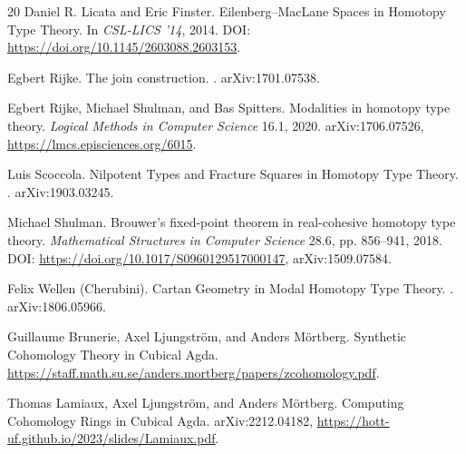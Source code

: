 \documentclass[a4paper,UKenglish,cleveref, autoref, thm-restate]{lipics-v2021}
\begin{document}
\begin{thebibliography}{20}
Daniel R. Licata and Eric Finster.
\newblock Eilenberg--MacLane Spaces in Homotopy Type Theory.
\newblock In \emph{CSL-LICS '14}, 2014.
\newblock DOI: \url{https://doi.org/10.1145/2603088.2603153}.

Egbert Rijke.
\newblock The join construction.
. arXiv:1701.07538.

Egbert Rijke, Michael Shulman, and Bas Spitters.
\newblock Modalities in homotopy type theory.
\newblock \emph{Logical Methods in Computer Science} 16.1, 2020.
\newblock arXiv:1706.07526, \url{https://lmcs.episciences.org/6015}.

Luis Scoccola.
\newblock Nilpotent Types and Fracture Squares in Homotopy Type Theory.
. arXiv:1903.03245.

Michael Shulman.
\newblock Brouwer’s fixed-point theorem in real-cohesive homotopy type theory.
\newblock \emph{Mathematical Structures in Computer Science} 28.6, pp. 856--941, 2018.
\newblock DOI: \url{https://doi.org/10.1017/S0960129517000147}, arXiv:1509.07584.

Felix Wellen (Cherubini).
\newblock Cartan Geometry in Modal Homotopy Type Theory.
. arXiv:1806.05966.

Guillaume Brunerie, Axel Ljungström, and Anders Mörtberg.
\newblock Synthetic Cohomology Theory in Cubical Agda.
\newblock \url{https://staff.math.su.se/anders.mortberg/papers/zcohomology.pdf}.

Thomas Lamiaux, Axel Ljungström, and Anders Mörtberg.
\newblock Computing Cohomology Rings in Cubical Agda.
\newblock arXiv:2212.04182, \url{https://hott-uf.github.io/2023/slides/Lamiaux.pdf}.

\end{thebibliography}
\end{document}
